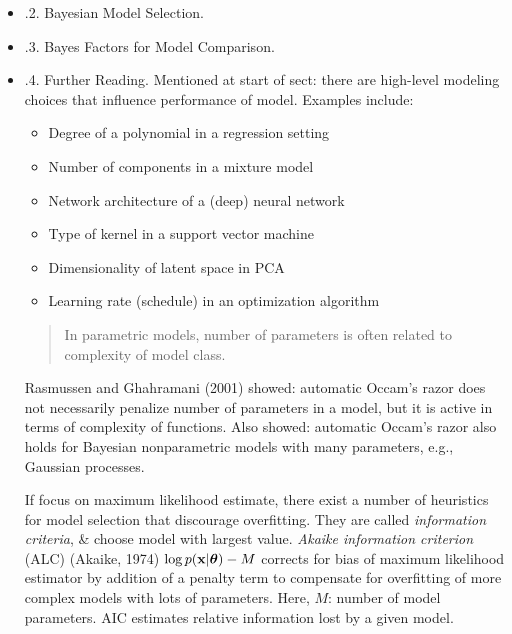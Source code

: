 \documentclass{article}
\begin{document}
\begin{itemize}
\begin{itemize}
		\item {.2. Bayesian Model Selection.}
		\item {.3. Bayes Factors for Model Comparison.}
		\item {.4. Further Reading.} Mentioned at start of sect: there are high-level modeling choices that influence performance of model. Examples include:
		\begin{itemize}
			\item Degree of a polynomial in a regression setting
			\item Number of components in a mixture model
			\item Network architecture of a (deep) neural network
			\item Type of kernel in a support vector machine
			\item Dimensionality of latent space in PCA
			\item Learning rate (schedule) in an optimization algorithm
		\end{itemize}
		\begin{quote}
			In parametric models, number of parameters is often related to complexity of model class.
		\end{quote}
		Rasmussen and Ghahramani (2001) showed: automatic Occam's razor does not necessarily penalize number of parameters in a model, but it is active in terms of complexity of functions. Also showed: automatic Occam's razor also holds for Bayesian nonparametric models with many parameters, e.g., Gaussian processes.
		
		If focus on maximum likelihood estimate, there exist a number of heuristics for model selection that discourage overfitting. They are called {\it information criteria}, \& choose model with largest value. {\it Akaike information criterion} (ALC) (Akaike, 1974) $\log p({\bf x}|\boldsymbol{\theta}) - M$ corrects for bias of maximum likelihood estimator by addition of a penalty term to compensate for overfitting of more complex models with lots of parameters. Here, $M$: number of model parameters. AIC estimates relative information lost by a given model.
		

\end{itemize}
\end{itemize}
\end{document}
